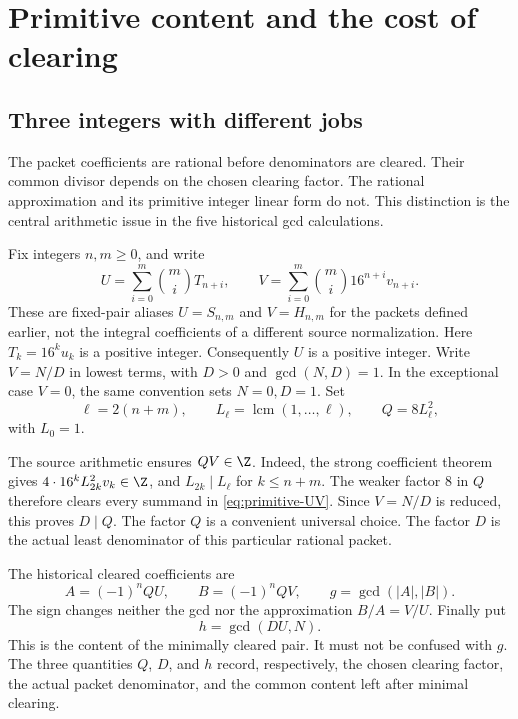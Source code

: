 \chapter{Primitive content and the cost of clearing}
\label{chap:primitive-content}

\section{Three integers with different jobs}

The packet coefficients are rational before denominators are cleared. Their common divisor depends on the chosen clearing factor. The rational approximation and its primitive integer linear form do not. This distinction is the central arithmetic issue in the five historical gcd calculations.

Fix integers $n,m\geq0$, and write
\begin{equation}
 U=\sum_{i=0}^{m}\binom miT_{n+i},\qquad
 V=\sum_{i=0}^{m}\binom mi16^{n+i}v_{n+i}.
 \label{eq:primitive-UV}
\end{equation}
These are fixed-pair aliases $U=S_{n,m}$ and $V=H_{n,m}$ for the packets defined earlier, not the integral coefficients of a different source normalization. Here $T_k=16^ku_k$ is a positive integer. Consequently $U$ is a positive integer. Write $V=N/D$ in lowest terms, with $D>0$ and $\gcd(N,D)=1$. In the exceptional case $V=0$, the same convention sets $N=0,D=1$. Set
\begin{equation}
 \ell=2(n+m),\qquad L_\ell=\operatorname{lcm}(1,\ldots,\ell),
 \qquad Q=8L_\ell^2,
 \label{eq:Q-clearance}
\end{equation}
with $L_0=1$.

The source arithmetic ensures $QV\in\Z$. Indeed, the strong coefficient theorem gives $4\cdot16^kL_{2k}^2v_k\in\Z$, and $L_{2k}\mid L_\ell$ for $k\leq n+m$. The weaker factor $8$ in $Q$ therefore clears every summand in \eqref{eq:primitive-UV}. Since $V=N/D$ is reduced, this proves $D\mid Q$. The factor $Q$ is a convenient universal choice. The factor $D$ is the actual least denominator of this particular rational packet.

The historical cleared coefficients are
\begin{equation}
 A=(-1)^nQU,\qquad B=(-1)^nQV,
 \qquad g=\gcd(|A|,|B|).
 \label{eq:cleared-pair}
\end{equation}
The sign changes neither the gcd nor the approximation $B/A=V/U$. Finally put
\begin{equation}
 h=\gcd(DU,N).
 \label{eq:minimal-content}
\end{equation}
This is the content of the minimally cleared pair. It must not be confused with $g$. The three quantities $Q$, $D$, and $h$ record, respectively, the chosen clearing factor, the actual packet denominator, and the common content left after minimal clearing.

